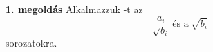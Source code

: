 \par{\bf 1. megoldás } Alkalmazzuk -t az 
$$
\frac{a_{i}}{\sqrt{b_{i}}} \ \text{és a} \ \sqrt{b_{i}}
$$
sorozatokra.
